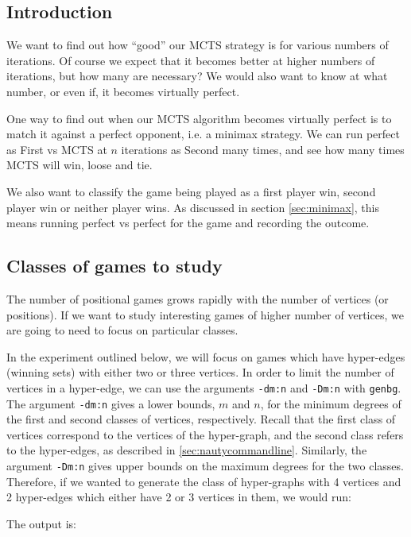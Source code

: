 \subsection{Introduction}


We want to find out how ``good'' our MCTS strategy is for various numbers of iterations.
Of course we expect that it becomes better at higher numbers of iterations, but how many are necessary?
We would also want to know at what number, or even if, it becomes virtually perfect.


One way to find out when our MCTS algorithm becomes virtually perfect is to match it against a perfect opponent, i.e. a minimax strategy.
We can run perfect as First vs MCTS at $n$ iterations as Second many times, and see how many times MCTS will win, loose and tie.

We also want to classify the game being played as a first player win, second player win or neither player wins.
As discussed in section \ref{sec:minimax}, this means running perfect vs perfect for the game and recording the outcome.


\subsection{Classes of games to study}

The number of positional games grows rapidly with the number of vertices (or positions).
If we want to study interesting games of higher number of vertices, we are going to need to focus on particular classes.

In the experiment outlined below, we will focus on games which have hyper-edges (winning sets) with either two or three vertices.
In order to limit the number of vertices in a hyper-edge, we can use the arguments \texttt{-dm:n} and \texttt{-Dm:n} with \texttt{genbg}.
The argument \texttt{-dm:n} gives a lower bounds, $m$ and $n$, for the minimum degrees of the first and second classes of vertices, respectively.
Recall that the first class of vertices correspond to the vertices of the hyper-graph, and the second class refers to the hyper-edges, as described in \ref{sec:nautycommandline}.
Similarly, the argument \texttt{-Dm:n} gives upper bounds on the maximum degrees for the two classes.
Therefore, if we wanted to generate the class of hyper-graphs with 4 vertices and 2 hyper-edges which either have 2 or 3 vertices in them, we would run:


The output is:

